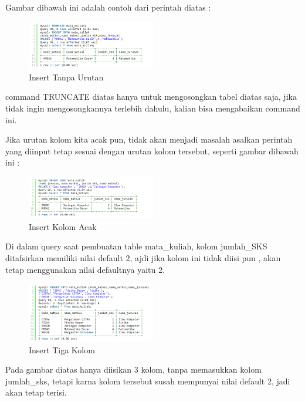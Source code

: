 	Gambar dibawah ini adalah contoh dari perintah diatas :
	
		\begin{figure}[ht]
			\centerline{\includegraphics[width=0.5\textwidth]{figures/insert3.png}}
			\caption{Insert Tanpa Urutan}
			\label{insert3}
			\end{figure}
			
	command TRUNCATE diatas hanya untuk mengosongkan tabel diatas saja, jika tidak ingin mengosongkannya terlebih dahulu, kalian bisa mengabaikan command ini.
	
	Jika urutan kolom kita acak pun, tidak akan menjadi masalah asalkan perintah yang diinput tetap sesuai dengan urutan kolom tersebut, seperti gambar dibawah ini :
	
		\begin{figure}[ht]
			\centerline{\includegraphics[width=0.5\textwidth]{figures/insert4.png}}
			\caption{Insert Kolom Acak}
			\label{insert4}
			\end{figure}
	
	Di dalam query saat pembuatan table mata_kuliah, kolom jumlah_SKS ditafsirkan memiliki nilai default 2, ajdi jika kolom ini tidak diisi pun , akan tetap menggunakan nilai defaultnya yaitu 2.
	
		\begin{figure}[ht]
			\centerline{\includegraphics[width=0.5\textwidth]{figures/insert5.png}}
			\caption{Insert Tiga Kolom}
			\label{insert5}
			\end{figure}
			
	Pada gambar diatas hanya diisikan 3 kolom, tanpa memasukkan kolom jumlah_sks, tetapi karna kolom tersebut susah mempunyai nilai default 2, jadi akan tetap terisi.
	
